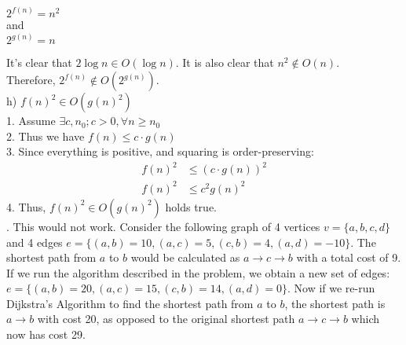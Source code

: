 \documentclass[12pt]{report}
\newcommand{\no}{\noindent}
\newcommand{\tab}{\hspace*{.6cm}}
\begin{document}
	\centering
	$2^{f(n)} = n^2$\\
	and\\
	$2^{g(n)} = n$\\
	\justify
	
	\tab It's clear that $2\log{n} \in O(\log{n})$. It is also clear that $n^2 \notin O(n)$.\\
	Therefore, $2^{f(n)} \notin O(2^{g(n)})$.\\
	
	\no h) 	$f(n)^2 \in O(g(n)^2)$\\
	\tab 1. Assume $\exists c, n_0; c > 0, \forall n \geq n_0$\\
	\tab 2. Thus we have $f(n) \leq c \cdot g(n)$ \\
	\tab 3. Since everything is positive, and squaring is order-preserving:
	\begin{align*}
	f(n)^2 &\leq (c\cdot g(n))^2\\
	f(n)^2 &\leq c^2g(n)^2
	\end{align*}
	\tab 4. Thus, $f(n)^2 \in O(g(n)^2)$ holds true.\\

	\no 5. This would not work. Consider the following graph of 4 vertices $v=\{a, b, c, d\}$ and 4 edges $e = \{(a,b) = 10, (a, c) = 5, (c, b) = 4, (a,d) = -10\}$. The shortest path from $a$ to $b$ would be calculated as $a\rightarrow c \rightarrow b$ with a total cost of 9. If we run the algorithm described in the problem, we obtain a new set of edges: $e = \{(a,b) = 20, (a,c) = 15, (c,b) = 14, (a,d) = 0\}$. Now if we re-run Dijkstra's Algorithm to find the shortest path from $a$ to $b$, the shortest path is $a\rightarrow b$ with cost 20, as opposed to the original shortest path $a\rightarrow c \rightarrow b$ which now has cost 29.
\end{document}
